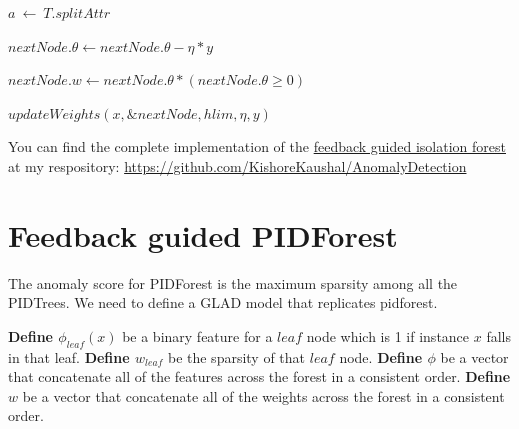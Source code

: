 \vspace{1em}
\begin{algorithm}[H]
    \caption{$updateWeights(x, T, hlim, \eta, y)$}\label{alg:update-weights-iforest}
    \DontPrintSemicolon
    \SetAlgoLined


    $a \: \leftarrow \: T.splitAttr$



    $nextNode.\theta \leftarrow nextNode.\theta - \eta * y$

    $nextNode.w \leftarrow nextNode.\theta * (nextNode.\theta \geq 0)$

    $updateWeights(x, \&nextNode, hlim, \eta, y)$
\end{algorithm}
\vspace{2em}

You can find the complete implementation of the  \href{https://github.com/KishoreKaushal/AnomalyDetection/blob/master/isolationforest/FeedbackIsolationForest.py}{feedback guided isolation forest} at my respository: \url{https://github.com/KishoreKaushal/AnomalyDetection}



\section{Feedback guided PIDForest}
\label{sec:feedback-guided-pidforest}

The anomaly score for PIDForest is the maximum sparsity among all the PIDTrees.
We need to define a GLAD model that replicates pidforest.

\textbf{Define $\phi_{leaf}(x)$} be a binary feature for a $leaf$ node which is 1 if instance $x$ falls in that leaf.
\textbf{Define $w_{leaf}$} be the sparsity of that $leaf$ node.
\textbf{Define $\phi$}  be a vector that concatenate all of the features across the forest in a consistent order.
\textbf{Define $w$}  be a vector that concatenate all of the weights across the forest in a consistent order.

